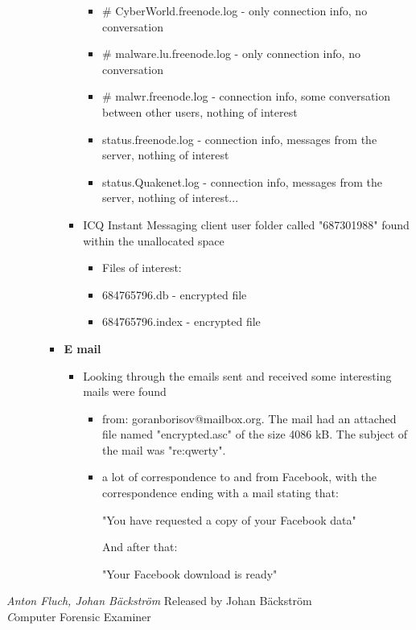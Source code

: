 \begin{enumerate}
\begin{itemize}
\begin{itemize}
\begin{itemize}
\begin{itemize}
		 		\item \# CyberWorld.freenode.log - only connection info, no conversation
		 		\item \# malware.lu.freenode.log - only connection info, no conversation
		 		\item \# malwr.freenode.log - connection info, some conversation between other users, nothing of interest
		 		\item status.freenode.log - connection info, messages from the server, nothing of interest
		 		\item status.Quakenet.log - connection info, messages from the server, nothing of interest...
		 	\end{itemize}
		 	
		 	\item ICQ Instant Messaging client user folder called "687301988" found within the unallocated space
		 	\begin{itemize}
		 		\item Files of interest: 
		 		\item 684765796.db - encrypted file
		 		\item 684765796.index - encrypted file
		 	\end{itemize}
		 	
		 \end{itemize}
		 
		 
		 
		 \item \textbf{E mail}
		 \begin{itemize}
		 		\item Looking through the emails sent and received some interesting mails were found
		 		 
		 		\begin{itemize}
		 			\item from: goranborisov@mailbox.org. The mail had an attached file named "encrypted.asc" of the size 4086 kB. The subject of the mail was "re:qwerty". 
		 			
		 			\item a lot of correspondence to and from Facebook, with the correspondence ending with a mail stating that:
		 			
		 			"You have requested a copy of your Facebook data"
		 			
		 			And after that:
		 			
		 			"Your Facebook download is ready"
		 			
		 		\end{itemize}
		 
		 
		 \end{itemize}
		
	\end{itemize}
	
		
	
\end{itemize}

\end{enumerate}

\noindent \textit{Anton Fluch, Johan Bäckström}	\hfill Released by {\wesa Johan Bäckström}\\
\textit Computer Forensic Examiner
\clearpage
